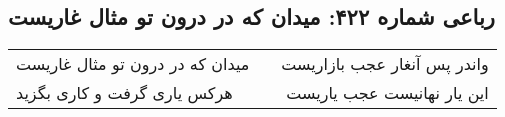 \begin{center}
\section*{رباعی شماره ۴۲۲: میدان که در درون تو مثال غاریست}
\label{sec:0422}
\begin{longtable}{l p{0.5cm} r}
میدان که در درون تو مثال غاریست
&&
واندر پس آنغار عجب بازاریست
\\
هرکس یاری گرفت و کاری بگزید
&&
این یار نهانیست عجب یاریست
\\
\end{longtable}
\end{center}
